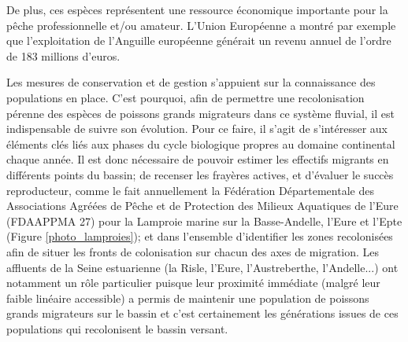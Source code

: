 \documentclass[11pt,titlepage,twoside]{article}\usepackage[]{graphicx}\usepackage[table]{xcolor}
\begin{document}
De plus, ces espèces représentent une ressource économique importante pour la pêche professionnelle et/ou amateur. L'Union Européenne a montré par exemple que l'exploitation de l'Anguille européenne générait un revenu annuel de l'ordre de 183 millions d'euros.

Les mesures de conservation et de gestion s'appuient sur la connaissance des populations en place. C'est pourquoi, afin de permettre une recolonisation pérenne des espèces de poissons grands migrateurs dans ce système fluvial, il est indispensable de suivre son évolution. Pour ce faire, il s'agit de s'intéresser aux éléments clés liés aux phases du cycle biologique propres au domaine continental chaque année. Il est donc nécessaire de pouvoir estimer les effectifs migrants en différents points du bassin; de recenser les frayères actives, et d'évaluer le succès reproducteur, comme le fait annuellement la Fédération Départementale des Associations Agréées de Pêche et de Protection des Milieux Aquatiques de l'Eure (FDAAPPMA 27) pour la Lamproie marine sur la Basse-Andelle, l'Eure et l'Epte \citep{sanson_suivi_2009,sanson_suivi_2010,barault_suivi_2013,sanson_suivi_2013}(Figure \ref{photo_lamproies}); et dans l'ensemble d'identifier les zones recolonisées afin de situer les fronts de colonisation sur chacun des axes de migration. Les affluents de la Seine estuarienne (la Risle, l'Eure, l'Austreberthe, l'Andelle...) ont notamment un rôle particulier puisque leur proximité immédiate (malgré leur faible linéaire accessible) a permis de maintenir une population de poissons grands migrateurs sur le bassin et c'est certainement les générations issues de ces populations qui recolonisent le bassin versant.
\end{document}
